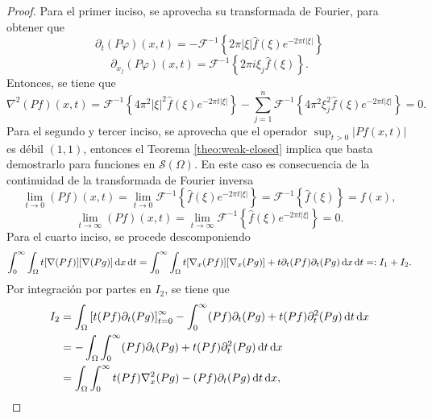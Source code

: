 \begin{proof}
	Para el primer inciso, se aprovecha su transformada de Fourier, para obtener que 
		\begin{equation*}
		\partial_t (P\varphi)(x, t) = - \mathcal{F}^{-1}\left\{2\pi|\xi| \widehat{f}(\xi) e^{-2\pi t |\xi|}  \right\}
	\end{equation*}
	\begin{equation*}
		\partial_{x_j} (P\varphi)(x, t) = \mathcal{F}^{-1}\left\{2\pi i\xi_j\widehat{f}(\xi)  \right\}.
	\end{equation*}
	Entonces, se tiene que 
	\begin{equation*}
		\nabla^2(Pf)(x, t) = \mathcal{F}^{-1}\left\{4\pi^2|\xi|^2 \widehat{f}(\xi) e^{-2\pi t |\xi|} \right\}- \sum_{j=1}^n 
		 \mathcal{F}^{-1}\left\{4\pi^2 \xi_j^2\widehat{f}(\xi) e^{-2\pi t |\xi|}\right\}
		 = 0.
	\end{equation*}
	Para el segundo y tercer inciso, se aprovecha que el operador $\sup_{t>0}|Pf(x, t)|$ es débil $(1, 1)$, entonces el Teorema \ref{theo:weak-closed} implica que basta demostrarlo para funciones en $\mathcal{S}(\Omega)$. En este caso es consecuencia de la continuidad de la transformada de Fourier inversa
	\begin{equation*}
		\lim_{t\to0} (Pf)(x, t) = \lim_{t\to0} \mathcal{F}^{-1}\left\{\widehat{f}(\xi) e^{-2\pi t |\xi|}\right\} = \mathcal{F}^{-1}\left\{\widehat{f}(\xi) \right\}  = f(x),
	\end{equation*}
	\begin{equation*}
		\lim_{t\to\infty} (Pf)(x, t) = \lim_{t\to\infty} \mathcal{F}^{-1}\left\{\widehat{f}(\xi) e^{-2\pi t |\xi|}\right\} =0.
	\end{equation*}
	Para el cuarto inciso, se procede descomponiendo
	\begin{equation*}
		 \int_0^\infty\int_{\Omega} t[\nabla(Pf)][\nabla(Pg)]\mathop{}\!\mathrm{d} x \mathop{}\!\mathrm{d} t = \int_0^\infty\int_{\Omega} t[\nabla_x(Pf)][\nabla_x(Pg)] + t\partial_t(Pf)\partial_t(Pg)\mathop{}\!\mathrm{d} x \mathop{}\!\mathrm{d} t =: I_1+I_2.
	\end{equation*}
	Por integración por partes en $I_2$, se tiene que
	\begin{align*}
		I_2& = \int_{\Omega} \left[ t(Pf)\partial_t(Pg) 
		\right]_{t=0}^\infty - \int_0^\infty (Pf)\partial_t(Pg) + t(Pf)\partial^2_t(Pg)\diff t \diff x \\  
		& =- \int_{\Omega}  \int_0^\infty (Pf)\partial_t(Pg) + t(Pf)\partial^2_t(Pg)\diff t \diff x\\
		&= \int_{\Omega}  \int_0^\infty   t(Pf)\nabla^2_x(Pg)-(Pf)\partial_t(Pg)\diff t \diff x,

\end{align*}
\end{proof}
